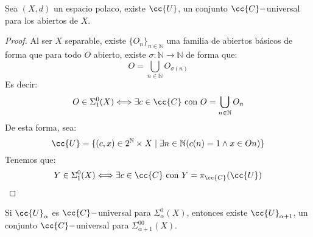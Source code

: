 \begin{lema}
    Sea $(X,d)$ un espacio polaco, existe $\cc{U}$, un conjunto $\cc{C}-$universal para los abiertos de $X$.
    \begin{proof}
        Al ser $X$ separable, existe ${\{O_n\}}_{n\in \mathbb{N}}$ una familia de abiertos básicos de forma que para todo $O$ abierto, existe $\sigma:\mathbb{N}\to\mathbb{N}$ de forma que:
        \begin{equation*}
            O = \bigcup_{n\in \mathbb{N}} O_{\sigma(n)}
        \end{equation*}
        Es decir:
        \begin{equation*}
            O\in \Sigma^0_1(X) \Longleftrightarrow \exists c\in \cc{C} \text{\ con\ } O = \bigcup_{n\in \mathbb{N}} O_n
        \end{equation*}
        De esta forma, sea:
        \begin{equation*}
            \cc{U} = \{(c,x)\in 2^\mathbb{N}\times X \mid \exists n\in \mathbb{N} (c(n)=1\land x\in On)\}
        \end{equation*}
        Tenemos que:
        \begin{equation*}
            Y\in \Sigma^0_1(X) \Longleftrightarrow \exists c\in \cc{C} \text{\ con\ } Y = \pi_{\cc{C}}(\cc{U})
        \end{equation*}
    \end{proof}
\end{lema}

\begin{lema}
    Si $\cc{U}_\alpha$ es $\cc{C}-$universal para $\Sigma^0_\alpha(X)$, entonces existe $\cc{U}_{\alpha+1}$, un conjunto $\cc{C}-$universal para $\Sigma^00_{\alpha+1}(X)$.
\end{lema}

